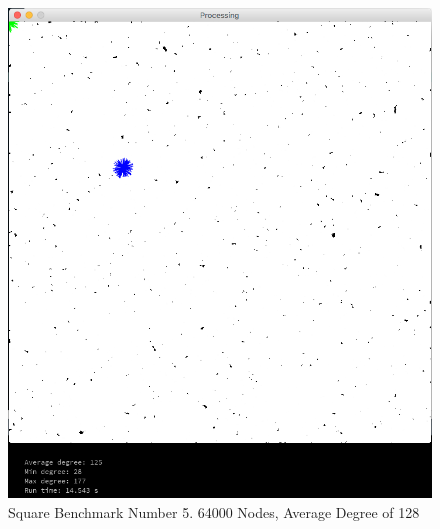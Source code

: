 \documentclass{article}
\begin{document}
\begin{center}
    \begin{figure}
        \includegraphics[scale=0.45]{./images/square_4.png}
        \caption{Square Benchmark Number 5. 64000 Nodes, Average Degree of 128}
        \label{square4}
    \end{figure}
\end{center}
\end{document}
